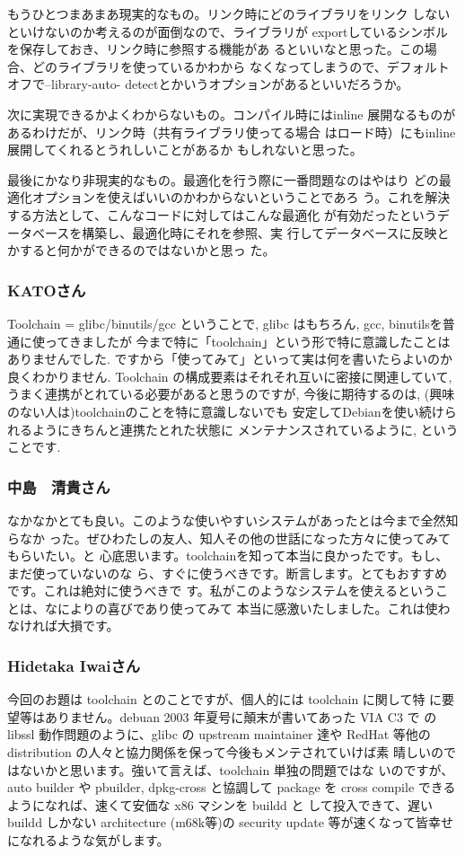 \documentclass[mingoth]{jsarticle}
\begin{document}
もうひとつまあまあ現実的なもの。リンク時にどのライブラリをリンク 
しないといけないのか考えるのが面倒なので、ライブラリが 
exportしているシンボルを保存しておき、リンク時に参照する機能があ 
るといいなと思った。この場合、どのライブラリを使っているかわから 
なくなってしまうので、デフォルトオフで--library-auto- 
detectとかいうオプションがあるといいだろうか。

次に実現できるかよくわからないもの。コンパイル時にはinline 
展開なるものがあるわけだが、リンク時（共有ライブラリ使ってる場合 
はロード時）にもinline展開してくれるとうれしいことがあるか 
もしれないと思った。

最後にかなり非現実的なもの。最適化を行う際に一番問題なのはやはり 
どの最適化オプションを使えばいいのかわからないということであろ 
う。これを解決する方法として、こんなコードに対してはこんな最適化 
が有効だったというデータベースを構築し、最適化時にそれを参照、実 
行してデータベースに反映とかすると何かができるのではないかと思っ 
た。

\subsubsection{KATOさん}


Toolchain = glibc/binutils/gcc ということで,
glibc はもちろん, gcc, binutilsを普通に使ってきましたが
今まで特に「toolchain」という形で特に意識したことはありませんでした.
ですから「使ってみて」といって実は何を書いたらよいのか良くわかりません.
Toolchain の構成要素はそれそれ互いに密接に関連していて,
うまく連携がとれている必要があると思うのですが,
今後に期待するのは, (興味のない人は)toolchainのことを特に意識しないでも
安定してDebianを使い続けられるようにきちんと連携たとれた状態に
メンテナンスされているように, ということです.

\subsubsection{中島　清貴さん}

なかなかとても良い。このような使いやすいシステムがあったとは今まで全然知らなか
った。ぜひわたしの友人、知人その他の世話になった方々に使ってみてもらいたい。と
心底思います。toolchainを知って本当に良かったです。もし、まだ使っていないのな
ら、すぐに使うべきです。断言します。とてもおすすめです。これは絶対に使うべきで
す。私がこのようなシステムを使えるということは、なによりの喜びであり使ってみて
本当に感激いたしました。これは使わなければ大損です。

\subsubsection{Hidetaka Iwaiさん}
今回のお題は toolchain とのことですが、個人的には toolchain に関して特
に要望等はありません。debuan 2003 年夏号に顛末が書いてあった VIA C3 で
の libssl 動作問題のように、glibc の upstream maintainer 達や RedHat
等他の distribution の人々と協力関係を保って今後もメンテされていけば素
晴しいのではないかと思います。強いて言えば、toolchain 単独の問題ではな
いのですが、auto builder や pbuilder, dpkg-cross と協調して package を
cross compile できるようになれば、速くて安価な x86 マシンを buildd と
して投入できて、遅い buildd しかない architecture (m68k等)の security
update 等が速くなって皆幸せになれるような気がします。
\end{document}
